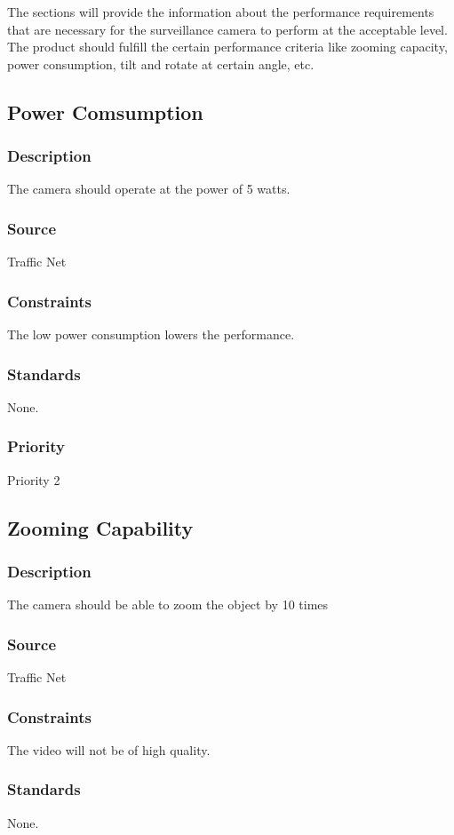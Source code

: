 The sections will provide the information about the performance requirements that are necessary for the surveillance camera to perform at the acceptable level. The product should fulfill the certain performance criteria like zooming capacity, power consumption, tilt and rotate at certain angle, etc. 


\subsection{Power Comsumption}
\subsubsection{Description}
The camera should operate at the power of 5 watts.
\subsubsection{Source}
Traffic Net
\subsubsection{Constraints}
The low power consumption lowers the performance.
\subsubsection{Standards}
None.
\subsubsection{Priority}
Priority 2


\subsection{Zooming Capability}
\subsubsection{Description}
The camera should be able to zoom the object by 10 times
\subsubsection{Source}
Traffic Net
\subsubsection{Constraints}
The video will not be of high quality.
\subsubsection{Standards}
None.
